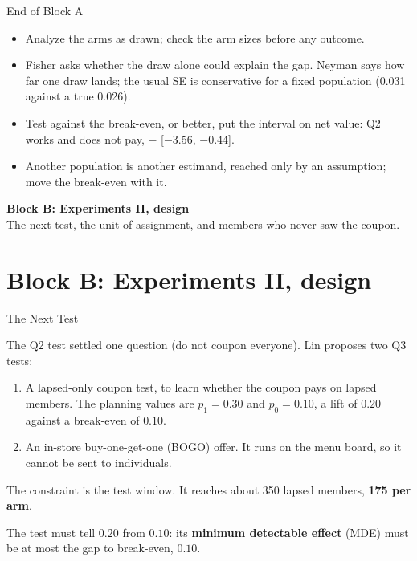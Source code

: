\documentclass[aspectratio=169, 11pt, handout]{beamer}
\begin{document}
\begin{frame}{End of Block A}

\begin{itemize}
  \item Analyze the arms as drawn; check the arm sizes before any outcome.
  \item Fisher asks whether the draw alone could explain the gap. Neyman says how far one draw lands; the usual SE is conservative for a fixed population (0.031 against a true 0.026).
  \item Test against the break-even, or better, put the interval on net value: Q2 works and does not pay, $-$ [$-$3.56, $-$0.44].
  \item Another population is another estimand, reached only by an assumption; move the break-even with it.
\end{itemize}

\vfill

\begin{center}
\Large \textbf{Block B: Experiments II, design}\\[0.4em]
\normalsize The next test, the unit of assignment, and members who never saw the coupon.
\end{center}
\vfill
\end{frame}

\section{Block B: Experiments II, design}

\begin{frame}{The Next Test}

The Q2 test settled one question (do not coupon everyone). Lin proposes two Q3 tests:

\begin{enumerate}
    \item A lapsed-only coupon test, to learn whether the coupon pays on lapsed members. The planning values are $p_1 = 0.30$ and $p_0 = 0.10$, a lift of $0.20$ against a break-even of $0.10$.
    \item An in-store buy-one-get-one (BOGO) offer. It runs on the menu board, so it cannot be sent to individuals.
\end{enumerate}

\bigskip

The constraint is the test window. It reaches about 350 lapsed members, \textbf{175 per arm}.

\bigskip

\begin{center}
The test must tell $0.20$ from $0.10$: its \textbf{minimum detectable effect} (MDE) must be at most the gap to break-even, $0.10$.
\end{center}
\end{frame}
\end{document}
